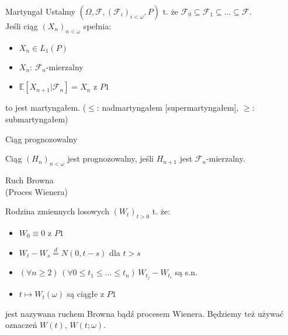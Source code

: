 \documentclass[avery5371,grid,frame]{flashcards}
\begin{document}
\begin{flashcard}[]{}
\end{flashcard}


\begin{flashcard}[Definicja]{Martyngał}
\smallskip
Ustalmy $ \left( \Omega, \mathcal{F}, \left( \mathcal{F}_i \right) _{i < \omega}, P \right) $ t. że $\mathcal{F}_0 \subseteq \mathcal{F}_1 \subseteq ... \subseteq \mathcal{F}$. \\
Jeśli ciąg $\left( X_n \right) _{n < \omega} $ spełnia:
\begin{itemize}
\item $ X_n \in L_1(P) $
\item $ X_n $: $ \mathcal{F}_n $-mierzalny
\item $ \mathbb{E} [ X_{n+1} | \mathcal{F}_n ] = X_n $ z $P1$
\end{itemize}
to jest martyngałem. ($ \leq $: nadmartyngałem [supermartyngałem], $ \geq $: submartyngałem)
\end{flashcard}

\begin{flashcard}[Definicja]{Ciąg prognozowalny}

\smallskip
Ciąg $ \left( H_n \right) _{n < \omega} $ jest prognozowalny, jeśli $H_{n+1}$ jest $\mathcal{F}_n$-mierzalny.
\end{flashcard}

\begin{flashcard}[]{}
\end{flashcard}


\begin{flashcard}[Definicja]{Ruch Browna \\ (Proces Wienera)}

Rodzina zmiennych losowych $ \left( W_t \right) _{t > 0} $ t. że:
\begin{itemize}
\item $W_0 \equiv 0$ z $P1$
\item $W_t - W_s \stackrel{d}{=} N(0, t-s)$ dla $ t > s $
\item $(\forall {n \geq 2}) \, (\forall { 0 \leq t_1 \leq ... \leq t_n }) \, W_{t_j} - W_{t_i}$ są s.n.
\item $t \mapsto W_t(\omega)$ są ciągłe z $P1$
\end{itemize}
jest nazywana ruchem Browna bądź procesem Wienera. Będziemy też używać oznaczeń $W(t)$, $W(t; \omega)$.
\end{flashcard}
\end{document}
